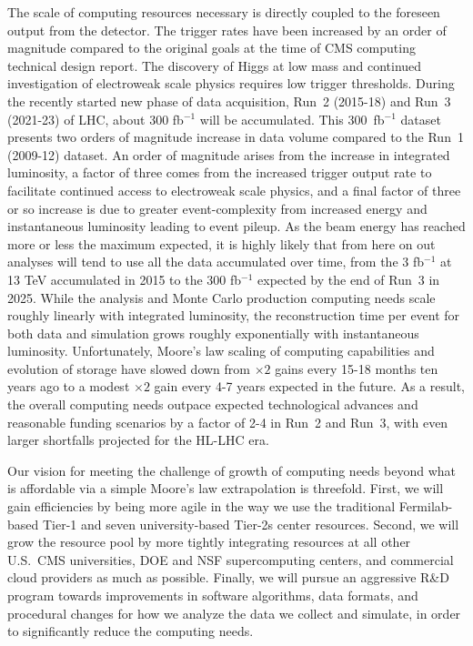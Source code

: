 \documentclass[11pt,a4paper]{article}
\begin{document}
The scale of computing resources necessary is directly coupled to the
foreseen output from the detector.  The trigger rates have been increased
by an order of magnitude compared to the original goals at the time of CMS
computing technical design report. The discovery of Higgs at low mass and
continued investigation of electroweak scale physics requires low trigger
thresholds.  During the recently started new phase of data acquisition,
Run~2 (2015-18) and Run~3 (2021-23) of LHC, about 300 fb$^{-1}$ will be
accumulated. This 300~fb$^{-1}$ dataset presents two orders of magnitude
increase in data volume compared to the Run~1 (2009-12) dataset.  An order
of magnitude arises from the increase in integrated luminosity, a factor of
three comes from the increased trigger output rate to facilitate continued
access to electroweak scale physics, and a final factor of three or so
increase is due to greater event-complexity from increased energy and
instantaneous luminosity leading to event pileup.  As the beam energy has
reached more or less the maximum expected, it is highly likely that from
here on out analyses will tend to use all the data accumulated over time,
from the 3 fb$^{-1}$ at 13 TeV accumulated in 2015 to the 300 fb$^{-1}$
expected by the end of Run~3 in 2025.  While the analysis and Monte Carlo
production computing needs scale roughly linearly with integrated
luminosity, the reconstruction time per event for both data and simulation
grows roughly exponentially with instantaneous luminosity.  Unfortunately,
Moore's law scaling of computing capabilities and evolution of storage have
slowed down from $\times 2$ gains every 15-18 months ten years ago to a
modest $\times 2$ gain every 4-7 years expected in the future.  As a
result, the overall computing needs outpace expected technological advances
and reasonable funding scenarios by a factor of 2-4 in Run~2 and Run~3, with even
larger shortfalls projected for the HL-LHC era.

Our vision for meeting the challenge of growth of computing needs
beyond what is affordable via a simple Moore's law extrapolation is
threefold. First, we will gain efficiencies by being  more
agile in the way we use the traditional Fermilab-based Tier-1 and seven
university-based Tier-2s center resources. Second, we will grow the
resource pool by more tightly integrating resources at all other
U.S.~CMS universities, DOE and NSF supercomputing centers, and
commercial cloud providers as much as possible. Finally, we will
pursue an aggressive R\&D program towards improvements in software
algorithms, data formats, and procedural changes for how we analyze
the data we collect and simulate, in order to significantly reduce the
computing needs.
\end{document}

